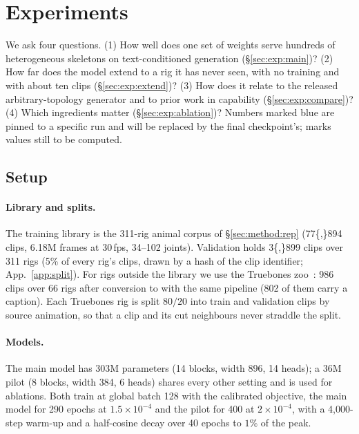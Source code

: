 \section{Experiments}\label{sec:exp}

We ask four questions. (1) How well does one set of weights serve hundreds of heterogeneous
skeletons on text-conditioned generation (\S\ref{sec:exp:main})? (2) How far does the model
extend to a rig it has never seen, with no training and with about ten clips
(\S\ref{sec:exp:extend})? (3) How does it relate to the released arbitrary-topology generator
and to prior work in capability (\S\ref{sec:exp:compare})? (4) Which ingredients matter
(\S\ref{sec:exp:ablation})? Numbers marked \num{blue} are pinned to a specific run and will be
replaced by the final checkpoint's;  marks values still to be computed.

\subsection{Setup}\label{sec:exp:setup}

\paragraph{Library and splits.} The training library is the \num{311}-rig animal corpus of
\S\ref{sec:method:rep} (\num{77{,}894} clips, \num{6.18}M frames at 30\,fps, 34--102 joints).
Validation holds \num{3{,}899} clips over \num{311} rigs (\num{5}\% of every rig's clips, drawn by a
hash of the clip identifier; App.~\ref{app:split}). For rigs outside the library we use the
Truebones zoo~\citep{truebones}: \num{986} clips over \num{66} rigs after conversion to \rep{}
with the same pipeline (\num{802} of them carry a caption). Each Truebones rig is split
$80/20$ into train and validation clips by source animation, so that a clip and its cut
neighbours never straddle the split.

\paragraph{Models.} The main model has \num{303}M parameters (14 blocks, width 896, 14 heads);
a \num{36}M pilot (8 blocks, width 384, 6 heads) shares every other setting and is used for
ablations. Both train at global batch 128 with the calibrated objective, the main model for
\num{290} epochs at $1.5{\times}10^{-4}$ and the pilot for 400 at $2{\times}10^{-4}$, with a
4{,}000-step warm-up and a half-cosine decay over 40 epochs to $1\%$ of the peak.

